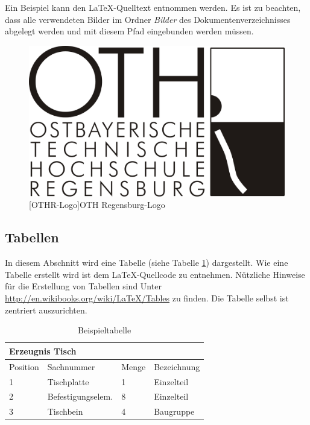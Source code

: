 \documentclass[12pt,a4paper, listof=entryprefix, bibliography=totocnumbered,toc=listofnumbered,lof=listofnumbered]{scrartcl}
\newcounter{verzeichnis}
\begin{document}
Ein Beispiel kann den \LaTeX-Quelltext entnommen werden. Es ist zu beachten, dass alle verwendeten Bilder im Ordner \emph{Bilder} des Dokumentenverzeichnisses abgelegt werden und mit diesem Pfad eingebunden werden müssen.

\begin{figure}[H]
	\centering
	\includegraphics[width=0.5\linewidth]{Bilder/othlogo} 
	[OTHR-Logo]{OTH Regensburg-Logo}
	\label{fig:osgi}
\end{figure}

\subsection{Tabellen}
\label{ch_tabellen}
In diesem Abschnitt wird eine Tabelle (siehe Tabelle \ref{tab:beispiel}) dargestellt. Wie eine Tabelle erstellt wird ist dem \LaTeX-Quellcode zu entnehmen. Nützliche Hinweise für die Erstellung von Tabellen sind Unter \url{http://en.wikibooks.org/wiki/LaTeX/Tables} zu finden. Die Tabelle selbst ist zentriert auszurichten.

\begin{table}[H]	%
	\centering		%
	\begin{tabularx}{\linewidth}{|X|X|X|X|}  
	\hline %
	\multicolumn{4}{|l|}{Erzeugnis Tisch}\\ \hline 
	\hline %
	\rowcolor{grey} Position & Sachnummer & Menge & Bezeichnung \\ \hline 
	1 &	Tischplatte & 1 & Einzelteil       \\ %
	2 &	Befestigungselem. & 8 & Einzelteil \\ %
	3 &	Tischbein &	4 &	Baugruppe          \\ %
	\hline %
	\end{tabularx}
	\caption{Beispieltabelle} %
	\label{tab:beispiel}
\end{table}
\end{document}
